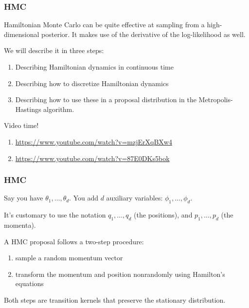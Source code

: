 \documentclass{beamer}
\begin{document}
\begin{frame}
\frametitle{HMC}

Hamiltonian Monte Carlo can be quite effective at sampling from a high-dimensional posterior. It makes use of the derivative of the log-likelihood as well. 
\newline

We will describe it in three steps: 
\begin{enumerate}
\item Describing Hamiltonian dynamics in continuous time
\item Describing how to discretize Hamiltonian dynamics
\item Describing how to use these in a proposal distribution in the Metropolis-Hastings algorithm.
\end{enumerate}

\pause
Video time! 
\begin{enumerate}
\item \url{https://www.youtube.com/watch?v=mzjErXqBXw4}
\item \url{https://www.youtube.com/watch?v=87E0DKs5bok}
\end{enumerate}

\end{frame}

\begin{frame}
\frametitle{HMC}

Say you have $\theta_1, \ldots, \theta_d$. You add $d$ auxiliary variables: $\phi_1, \ldots, \phi_d$.
\newline

It's customary to use the notation $q_1, \ldots, q_d$ (the positions), and $p_1, \ldots, p_d$ (the momenta).
\newline
\pause

A HMC proposal follows a two-step procedure:
\begin{enumerate}
\item sample a random momentum vector
\item transform the momentum and position nonrandomly using Hamilton's equations
\end{enumerate}
Both steps are transition kernels that preserve the stationary distribution.

\end{frame}
\end{document}
